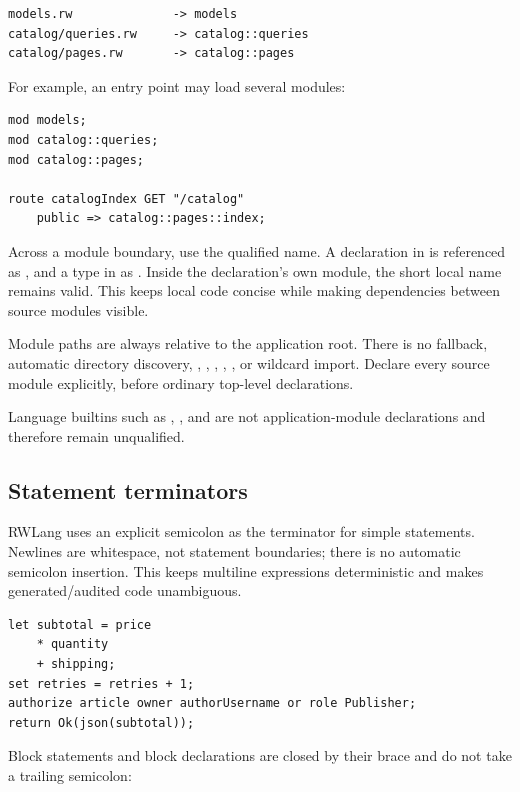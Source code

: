 \begin{lstlisting}
models.rw              -> models
catalog/queries.rw     -> catalog::queries
catalog/pages.rw       -> catalog::pages
\end{lstlisting}

For example, an entry point may load several modules:

\begin{lstlisting}[language=RWLang]
mod models;
mod catalog::queries;
mod catalog::pages;

route catalogIndex GET "/catalog"
    public => catalog::pages::index;
\end{lstlisting}

Across a module boundary, use the qualified name. A declaration in  is referenced as , and a type in  as . Inside the declaration's own module, the short local name remains valid. This keeps local code concise while making dependencies between source modules visible.

Module paths are always relative to the application root. There is no  fallback, automatic directory discovery, , , , , , or wildcard import. Declare every source module explicitly, before ordinary top-level declarations.

Language builtins such as , , and  are not application-module declarations and therefore remain unqualified.

\subsection*{Statement terminators}

RWLang uses an explicit semicolon as the terminator for simple statements. Newlines are whitespace, not statement boundaries; there is no automatic semicolon insertion. This keeps multiline expressions deterministic and makes generated/audited code unambiguous.

\begin{lstlisting}[language=RWLang]
let subtotal = price
    * quantity
    + shipping;
set retries = retries + 1;
authorize article owner authorUsername or role Publisher;
return Ok(json(subtotal));
\end{lstlisting}

Block statements and block declarations are closed by their brace and do not take a trailing semicolon:

